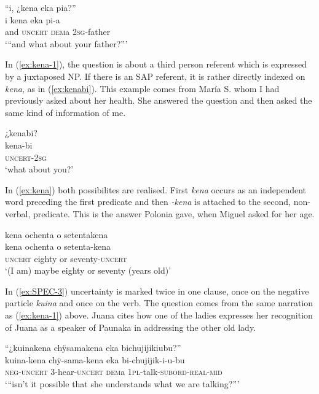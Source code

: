 \ea\label{ex:kena-1}
\begingl 
\glpreamble “i, ¿kena eka pia?”\\
\gla i kena eka pi-a\\ 
\glb and \textsc{uncert} \textsc{dem}a 2\textsc{sg}-father\\ 
\glft ‘“and what about your father?”’
\trailingcitation{[jxx-p120515l-1.124]}
\xe
 
In (\ref{ex:kena-1}), the question is about a third person referent which is expressed by a juxtaposed NP. If there is an SAP referent, it is rather directly indexed on \textit{kena}, as in (\ref{ex:kenabi}). This example comes from María S. whom I had previously asked about her health. She answered the question and then asked the same kind of information of me.

\ea\label{ex:kenabi}
\begingl
\glpreamble ¿kenabi?\\
\gla kena-bi\\
\glb \textsc{uncert}-2\textsc{sg}\\
\glft ‘what about you?’
\endgl
\trailingcitation{[rmx-e150922l.014]}
\xe
{}

In (\ref{ex:kena}) both possibilites are realised. First \textit{kena} occurs as an independent word preceding the first predicate and then \textit{-kena} is attached to the second, non-verbal, predicate. This is the answer Polonia gave, when Miguel asked for her age.

\ea\label{ex:kena}
\begingl 
\glpreamble kena ochenta o setentakena\\
\gla kena ochenta o setenta-kena\\ 
\glb \textsc{uncert} eighty or seventy-\textsc{uncert}\\ 
\glft ‘(I am) maybe eighty or seventy (years old)’
\trailingcitation{[mty-p110906l.104]}
\xe

In (\ref{ex:SPEC-3}) uncertainty is marked twice in one clause, once on the negative particle \textit{kuina} and once on the verb. The question comes from the same narration as (\ref{ex:kena-1}) above. Juana cites how one of the ladies expresses her recognition of Juana as a speaker of Paunaka in addressing the other old lady. 

\ea\label{ex:SPEC-3}
\begingl 
\glpreamble “¿kuinakena chÿsamakena eka bichujijikiubu?”\\
\gla  kuina-kena chÿ-sama-kena eka bi-chujijik-i-u-bu\\ 
\glb \textsc{neg}-\textsc{uncert} 3-hear-\textsc{uncert} \textsc{dem}a 1\textsc{pl}-talk-\textsc{subord}-\textsc{real}-\textsc{mid}\\ 
\glft ‘“isn’t it possible that she understands what we are talking?”’
\trailingcitation{[jxx-p120515l-1.087]}
\xe


